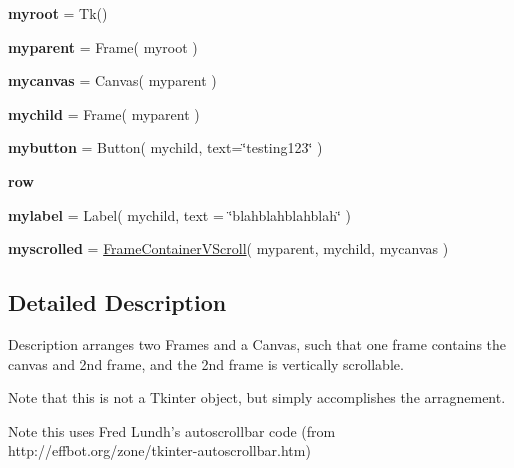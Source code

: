 \begin{DoxyCompactItemize}
\item 
{\bfseries myroot} = Tk()\hypertarget{namespaceframecontainervscroll_ad9fe63c267ed3fc4cf9c56f456378825}{}\label{namespaceframecontainervscroll_ad9fe63c267ed3fc4cf9c56f456378825}

\item 
{\bfseries myparent} = Frame( myroot )\hypertarget{namespaceframecontainervscroll_a875b3f72929d257e89aa58ad6bd37a44}{}\label{namespaceframecontainervscroll_a875b3f72929d257e89aa58ad6bd37a44}

\item 
{\bfseries mycanvas} = Canvas( myparent )\hypertarget{namespaceframecontainervscroll_a07a33d258e390135045f425295d804b0}{}\label{namespaceframecontainervscroll_a07a33d258e390135045f425295d804b0}

\item 
{\bfseries mychild} = Frame( myparent )\hypertarget{namespaceframecontainervscroll_a7f016d785c7ca7eb7a1c04f26d6f2c7e}{}\label{namespaceframecontainervscroll_a7f016d785c7ca7eb7a1c04f26d6f2c7e}

\item 
{\bfseries mybutton} = Button( mychild, text=\char`\"{}testing123\char`\"{} )\hypertarget{namespaceframecontainervscroll_ab63d4efa8116337d3b45349421ed6690}{}\label{namespaceframecontainervscroll_ab63d4efa8116337d3b45349421ed6690}

\item 
{\bfseries row}\hypertarget{namespaceframecontainervscroll_abab489cb6efdcfcaf421f0b0915585d2}{}\label{namespaceframecontainervscroll_abab489cb6efdcfcaf421f0b0915585d2}

\item 
{\bfseries mylabel} = Label( mychild, text = \char`\"{}blahblahblahblah\char`\"{} )\hypertarget{namespaceframecontainervscroll_aaff8a13d9de8247fe89529772413db45}{}\label{namespaceframecontainervscroll_aaff8a13d9de8247fe89529772413db45}

\item 
{\bfseries myscrolled} = \hyperlink{classframecontainervscroll_1_1FrameContainerVScroll}{Frame\+Container\+V\+Scroll}( myparent, mychild, mycanvas )\hypertarget{namespaceframecontainervscroll_a07f15dc0d5c533ef81047f9635bdcd18}{}\label{namespaceframecontainervscroll_a07f15dc0d5c533ef81047f9635bdcd18}

\end{DoxyCompactItemize}


\subsection{Detailed Description}
\begin{DoxyVerb}Description
arranges two Frames and a Canvas, such that 
one frame contains the canvas and 2nd frame,
and the 2nd frame is vertically scrollable.

Note that this is not a Tkinter object, but
simply accomplishes the arragnement.

Note this uses Fred Lundh's autoscrollbar code
(from http://effbot.org/zone/tkinter-autoscrollbar.htm)
\end{DoxyVerb}
 